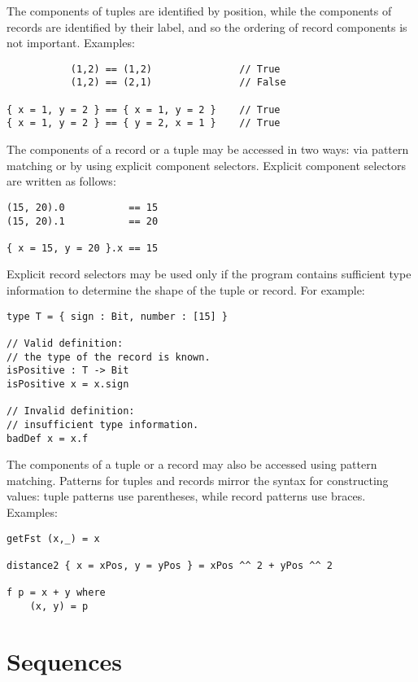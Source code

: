 The components of tuples are identified by position, while the
components of records are identified by their label, and so the ordering
of record components is not important. Examples:

\begin{verbatim}
           (1,2) == (1,2)               // True
           (1,2) == (2,1)               // False

{ x = 1, y = 2 } == { x = 1, y = 2 }    // True
{ x = 1, y = 2 } == { y = 2, x = 1 }    // True
\end{verbatim}

The components of a record or a tuple may be accessed in two ways: via
pattern matching or by using explicit component selectors. Explicit
component selectors are written as follows:

\begin{verbatim}
(15, 20).0           == 15
(15, 20).1           == 20

{ x = 15, y = 20 }.x == 15
\end{verbatim}

Explicit record selectors may be used only if the program contains
sufficient type information to determine the shape of the tuple or
record. For example:

\begin{verbatim}
type T = { sign : Bit, number : [15] }

// Valid definition:
// the type of the record is known.
isPositive : T -> Bit
isPositive x = x.sign

// Invalid definition:
// insufficient type information.
badDef x = x.f
\end{verbatim}

The components of a tuple or a record may also be accessed using pattern
matching. Patterns for tuples and records mirror the syntax for
constructing values: tuple patterns use parentheses, while record
patterns use braces. Examples:

\begin{verbatim}
getFst (x,_) = x

distance2 { x = xPos, y = yPos } = xPos ^^ 2 + yPos ^^ 2

f p = x + y where
    (x, y) = p
\end{verbatim}

\hypertarget{sequences}{%
\section{Sequences}\label{sequences}}

